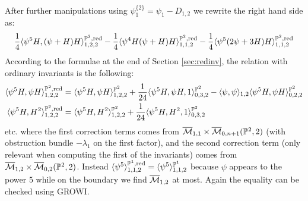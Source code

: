 \begin{ex}
\begin{multline*}
 \end{multline*}
After further manipulations using $\psi_1^{\{2\}}=\psi_1-D_{1,2}$ we rewrite the right hand side as:
\[\frac{1}{4}\langle\psi^5H,(\psi+H)H\rangle^{\mathbb P^2,\rm{red}}_{1,2,2}-\frac{1}{4}\langle\psi^4H(\psi+H)H\rangle^{\mathbb P^2,\rm{red}}_{1,1,2}-\frac{1}{4}\langle\psi^5(2\psi+3H)H\rangle^{\mathbb P^2,\rm{red}}_{1,1,2}\]
According to the formulae at the end of Section \ref{sec:redinv}, the relation with ordinary invariants is the following:
\begin{align*}
 \langle\psi^5H,\psi H\rangle^{\mathbb P^2,\rm{red}}_{1,2,2}&=\langle\psi^5H,\psi H\rangle^{\mathbb P^2}_{1,2,2}+\frac{1}{24}\langle\psi^5H,\psi H,1\rangle^{\mathbb P^2}_{0,3,2}-\langle\psi,\psi\rangle_{1,2}\langle\psi^5H,\psi H\rangle^{\mathbb P^2}_{0,2,2}\\
 \langle\psi^5H,H^2\rangle^{\mathbb P^2,\rm{red}}_{1,2,2}&=\langle\psi^5H, H^2\rangle^{\mathbb P^2}_{1,2,2}+\frac{1}{24}\langle\psi^5H, H^2,1\rangle^{\mathbb P^2}_{0,3,2}
\end{align*}
\noindent etc. where the first correction terms comes from $\overline{\mathcal{M}}_{1,1}\times\overline{\mathcal{M}}_{0,n+1}(\mathbb P^2,2)$ (with obstruction bundle $-\lambda_1$ on the first factor), and the second correction term (only relevant when computing the first of the invariants) comes from $\overline{\mathcal{M}}_{1,2}\times\overline{\mathcal{M}}_{0,2}(\mathbb P^2,2)$. Instead $\langle \psi^5\rangle^{\mathbb P^1,\rm{red}}_{1,1,2}=\langle \psi^5\rangle^{\mathbb P^1}_{1,1,2}$ because $\psi$ appears to the power $5$ while on the boundary we find $\overline{\mathcal{M}}_{1,2}$ at most. Again the equality can be checked using GROWI.
\end{ex}


